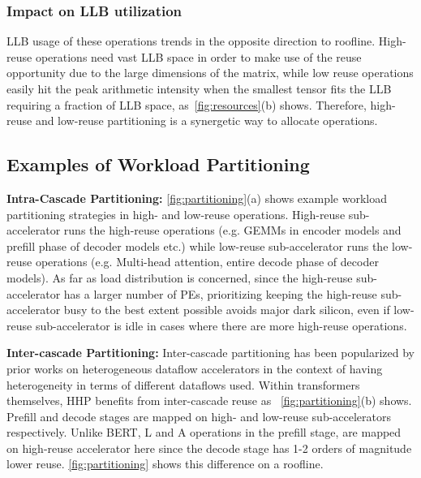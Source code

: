 

 

 \subsubsection{Impact on LLB utilization}
 
LLB usage of these operations trends in the opposite direction to roofline. High-reuse operations need vast LLB space in order to make use of the reuse opportunity due to the large dimensions of the matrix, while low reuse operations easily hit the peak arithmetic intensity when the smallest tensor fits the LLB requiring a fraction of LLB space, as~\autoref{fig:resources}(b) shows. Therefore, high-reuse and low-reuse partitioning is a synergetic way to allocate operations.



\subsection{Examples of Workload Partitioning}

\textbf{Intra-Cascade Partitioning:}
\autoref{fig:partitioning}(a) shows example workload partitioning strategies in high- and low-reuse operations. High-reuse sub-accelerator runs the high-reuse operations (e.g. GEMMs in encoder models and prefill phase of decoder models etc.) while low-reuse sub-accelerator runs the low-reuse operations (e.g. Multi-head attention, entire decode phase of decoder models). As far as load distribution is concerned, since the high-reuse sub-accelerator has a larger number of PEs, prioritizing keeping the high-reuse sub-accelerator busy to the best extent possible avoids major dark silicon, even if low-reuse sub-accelerator is idle in cases where there are more high-reuse operations.

\textbf{Inter-cascade Partitioning:}
Inter-cascade partitioning has been popularized by prior works on heterogeneous dataflow accelerators\cite{kwon2021heterogeneous,qin2022enabling} in the context of having heterogeneity in terms of different dataflows used.  Within transformers themselves, HHP benefits from inter-cascade reuse as ~\autoref{fig:partitioning}(b) shows. Prefill and decode stages are mapped on high- and low-reuse sub-accelerators respectively. Unlike BERT, L and A operations in the prefill stage, are mapped on high-reuse accelerator here since the decode stage has 1-2 orders of magnitude lower reuse. \autoref{fig:partitioning} shows this difference on a roofline.

